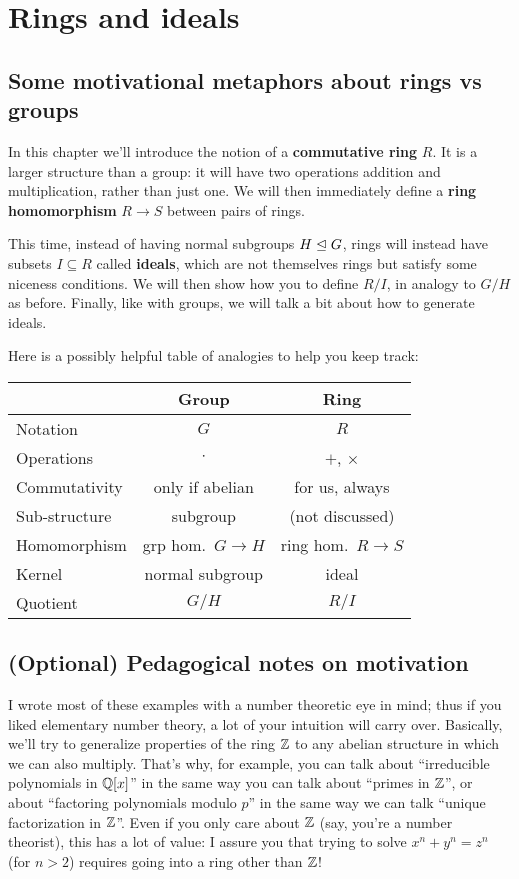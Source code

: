 \chapter{Rings and ideals}
\section{Some motivational metaphors about rings vs groups}
In this chapter we'll introduce the notion of
a \textbf{commutative ring} $R$.
It is a larger structure than a group:
it will have two operations addition and multiplication,
rather than just one.
We will then immediately define a \textbf{ring homomorphism}
$R \to S$ between pairs of rings.

This time, instead of having normal subgroups $H \trianglelefteq G$,
rings will instead have subsets $I \subseteq R$ called \textbf{ideals},
which are not themselves rings but satisfy some niceness conditions.
We will then show how you to define $R/I$,
in analogy to $G/H$ as before.
Finally, like with groups, we will talk a bit about how to generate ideals.

Here is a possibly helpful table of analogies to help you keep track:
\begin{center}
	\begin{tabular}[h]{lcc}
		& Group & Ring \\
		\hline
		Notation & $G$ & $R$ \\
		Operations & $\cdot$ & $+$, $\times$ \\
		Commutativity & only if abelian & for us, always \\
		Sub-structure & subgroup & (not discussed) \\
		Homomorphism & grp hom.\ $G \to H$ & ring hom.\ $R \to S$ \\
		Kernel & normal subgroup & ideal \\
		Quotient & $G/H$ & $R/I$ \\
	\end{tabular}
\end{center}

\section{(Optional) Pedagogical notes on motivation}
I wrote most of these examples with a number theoretic eye in mind;
thus if you liked elementary number theory,
a lot of your intuition will carry over.
Basically, we'll try to generalize properties of the ring $\mathbb Z$ to
any abelian structure in which we can also multiply.
That's why, for example, you can talk about
``irreducible polynomials in $\mathbb Q[x]$'' in the same
way you can talk about ``primes in $\mathbb Z$'',
or about ``factoring polynomials modulo $p$''
in the same way we can talk ``unique factorization in $\mathbb Z$''.
Even if you only care about $\mathbb Z$
(say, you're a number theorist), this has a lot of value:
I assure you that trying to solve $x^n+y^n = z^n$ (for $n > 2$)
requires going into a ring other than $\mathbb Z$!

